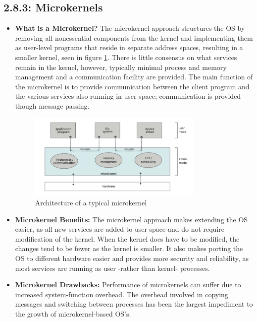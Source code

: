 \documentclass[12pt]{article}
\begin{document}
\subsection*{2.8.3: Microkernels}

\begin{itemize}
    \item \textbf{What is a Microkernel?} The microkernel approach structures the OS by removing all nonessential components from the kernel and implementing them as user-level programs that reside in separate address spaces, resulting in a smaller kernel, seen in figure \ref{fig:microkernel-structure}. There is little consensus on what services remain in the kernel, however, typically minimal process and memory management and a communication facility are provided. The main function of the microkernel is to provide communication between the client program and the various services also running in user space; communication is provided though message passing.
        \begin{figure}[ht]
            \centering
            \includegraphics[width=0.8\textwidth]{figures/microkernel-structure.jpg}
            \caption{Architecture of a typical microkernel}
            \label{fig:microkernel-structure}
        \end{figure}
    \item \textbf{Microkernel Benefits:} The microkernel approach makes extending the OS easier, as all new services are added to user space and do not require modification of the kernel. When the kernel does have to be modified, the changes tend to be fewer as the kernel is smaller. It also makes porting the OS to different hardware easier and provides more security and reliability, as most services are running as user -rather than kernel- processes.
    \item \textbf{Microkernel Drawbacks:} Performance of microkernels can suffer due to increased system-function overhead. The overhead involved in copying messages and switching between processes has been the largest impediment to the growth of microkernel-based OS's.
\end{itemize}
\end{document}
